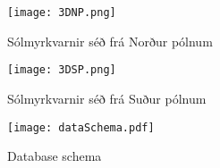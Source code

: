 \documentclass[12pt, git, final]{rureport}
\begin{document}
\begin{figure}
	\centering
	\texttt{[image: 3DNP.png]}
	\caption{Sólmyrkvarnir séð frá Norður pólnum}
	\label{fig:3DNP}
\end{figure}

\begin{figure}
	\centering
	\texttt{[image: 3DSP.png]}
	\caption{Sólmyrkvarnir séð frá Suður pólnum}
	\label{fig:3DSP}
\end{figure}

\begin{figure}
	\centering 
	\texttt{[image: dataSchema.pdf]}
	\caption{Database schema \label{fig:dataschema}}
\end{figure} 
%

\clearpage

\printbibliography
\end{document}
